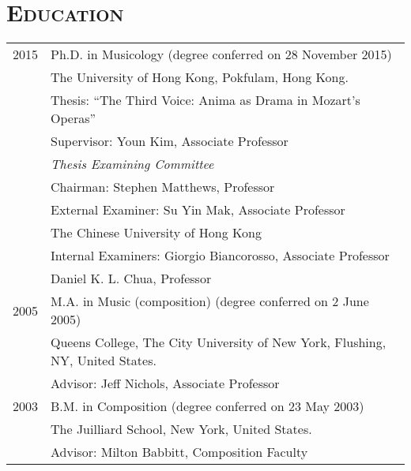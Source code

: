 \documentclass[a4paper,11pt]{article}
\begin{document}
%  
%  
  
  \section*{\textsc{Education}}
  
  \hspace*{-0.25cm}
  \begin{tabular}{p{2.5cm} l}
    2015 & Ph.D. in Musicology (degree conferred on 28 November 2015)\\
    & The University of Hong Kong, Pokfulam, Hong Kong.\\
    & Thesis: ``The Third Voice: Anima as Drama in Mozart's Operas''\\
    & Supervisor: Youn Kim, Associate Professor\\[2mm]
    & \textit{Thesis Examining Committee}\\
    & Chairman: Stephen Matthews, Professor\\
    & External Examiner: Su Yin Mak, Associate Professor\\
    & \hspace*{28.5mm} The Chinese University of Hong Kong\\
    & Internal Examiners: Giorgio Biancorosso, Associate Professor\\
    & \hspace*{29.5mm} Daniel K. L. Chua, Professor\\[2mm]
    
	2005 & M.A. in Music (composition) (degree conferred on 2 June 2005)\\
	& Queens College, The City University of New York, Flushing, NY, United States.\\
	& Advisor: Jeff Nichols, Associate Professor\\[2mm]

    2003 & B.M. in Composition (degree conferred on 23 May 2003)\\
    & The Juilliard School, New York, United States.\\
    & Advisor: Milton Babbitt, Composition Faculty
  \end{tabular}
  
\end{document}
